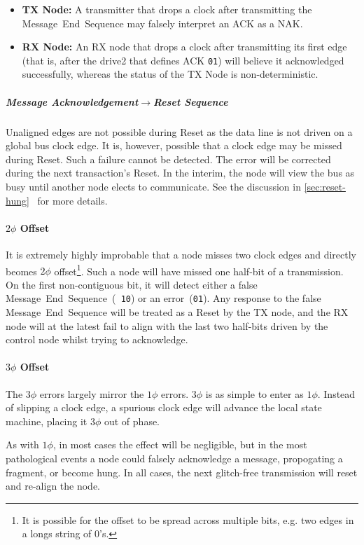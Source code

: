 \begin{itemize}
  \item {\bf TX Node:} A transmitter that drops a clock after transmitting the
Message~End~Sequence may falsely interpret an ACK as a NAK.

  \item {\bf RX Node:} An RX node that drops a clock after transmitting its
first edge (that is, after the {\sc drive2} that defines ACK {\tt 01}) will
believe it acknowledged successfully, whereas the status of the TX Node is
non-deterministic.
\end{itemize}

\subparagraph{Message Acknowledgement$\rightarrow$Reset Sequence}
Unaligned edges are not possible during Reset as the data line is not driven
on a global bus clock edge. It is, however, possible that a clock edge may be
missed during Reset. Such a failure cannot be detected. The error will be
corrected during the next transaction's Reset. In the interim, the node will
view the bus as busy until another node elects to communicate. See the
discussion in \ref{sec:reset-hung}~ for more details.


\paragraph{$2\phi$ Offset}
It is extremely highly improbable that a node misses two clock edges and
directly beomes $2\phi$ offset\footnote{
  It is possible for the offset to be spread across multiple bits, e.g.
  two edges in a longs string of 0's.}.
Such a node will have missed one half-bit of a transmission. On the first
non-contiguous bit, it will detect either a false Message~End~Sequence~({\tt
10}) or an error~({\tt 01}). Any response to the false Message~End~Sequence
will be treated as a Reset by the TX node, and the RX node will at the latest
fail to align with the last two half-bits driven by the control node whilst
trying to acknowledge.

\paragraph{$3\phi$ Offset}
The $3\phi$ errors largely mirror the $1\phi$ errors. $3\phi$ is as simple to
enter as $1\phi$. Instead of slipping a clock edge, a spurious clock edge will
advance the local state machine, placing it $3\phi$ out of phase.

As with $1\phi$, in most cases the effect will be negligible, but in the most
pathological events a node could falsely acknowledge a message, propogating a
fragment, or become hung. In all cases, the next glitch-free transmission will
reset and re-align the node.


